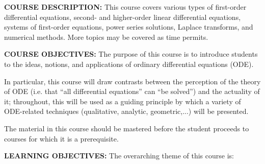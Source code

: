 \documentclass[12pt,oneside]{amsart}
\begin{document}
\noindent \textbf{COURSE DESCRIPTION:} This course covers various types of first-order differential equations, second- and higher-order linear differential equations, systems of first-order equations, power series solutions, Laplace transforms, and numerical methods. More topics may be covered as time permits.

\noindent \textbf{COURSE OBJECTIVES:} The purpose of this course is to introduce students to the ideas, notions, and applications of ordinary differential equations (ODE). \vspace{-3mm}

In particular, this course will draw contrasts between the perception of the theory of ODE (i.e. that ``all differential equations'' can ``be solved'') and the actuality of it; throughout, this will be used as a guiding principle by which a variety of ODE-related techniques (qualitative, analytic, geometric,...) will be presented. \vspace{-3mm}

The material in this course should be mastered before the student proceeds to courses for which it is a prerequisite.

\noindent \textbf{LEARNING OBJECTIVES:} The overarching theme of this course is:\vspace{-3mm}\begin{center}\end{center}\vspace{-1.5mm}
\end{document}
